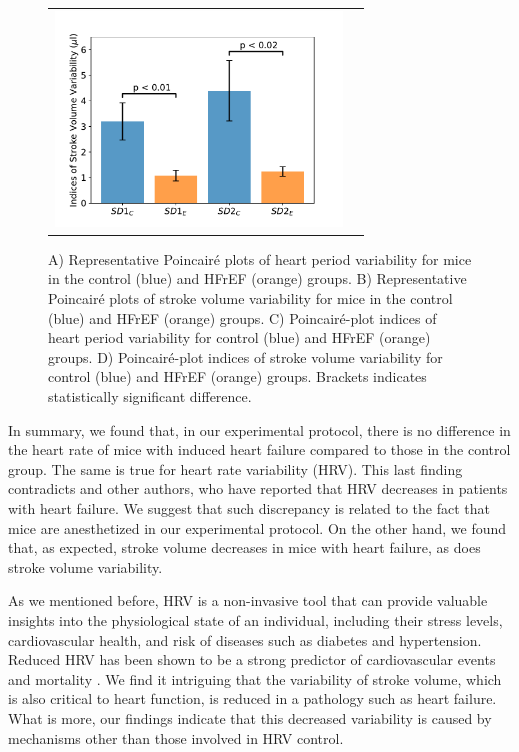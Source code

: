 \documentclass[%
preprint,
 amsmath,amssymb,
 aps,
]{revtex4-2}
\begin{document}
\begin{figure}[h!]
\begin{tabular}{cc}
        \includegraphics[width=3in]{Fig02_D.pdf}
    \end{tabular}
    \caption{A) Representative Poincairé plots of heart period variability for mice in the control (blue) and HFrEF (orange) groups. B) Representative Poincairé plots of stroke volume variability for mice in the control (blue) and HFrEF (orange) groups. C) Poincairé-plot indices of heart period variability for control (blue) and HFrEF (orange) groups. D) Poincairé-plot indices of stroke volume variability for control (blue) and HFrEF (orange) groups. Brackets indicates statistically significant difference.}
    \label{fig:fig02}
\end{figure}

In summary, we found that, in our experimental protocol, there is no difference in the heart rate of mice with induced heart failure compared to those in the control group. The same is true for heart rate variability (HRV). This last finding contradicts \citet{Kamen_1995} and other authors, who have reported that HRV decreases in patients with heart failure. We suggest that such discrepancy is related to the fact that mice are anesthetized in our experimental protocol. On the other hand, we found that, as expected, stroke volume decreases in mice with heart failure, as does stroke volume variability. 

As we mentioned before, HRV is a non-invasive tool that can provide valuable insights into the physiological state of an individual, including their stress levels, cardiovascular health, and risk of diseases such as diabetes and hypertension. Reduced HRV has been shown to be a strong predictor of cardiovascular events and mortality \citep{Zeki_Al_Hazzouri_2014}. We find it intriguing that the variability of stroke volume, which is also critical to heart function, is reduced in a pathology such as heart failure. What is more, our findings indicate that this decreased variability is caused by mechanisms other than those involved in HRV control. 
\end{document}
